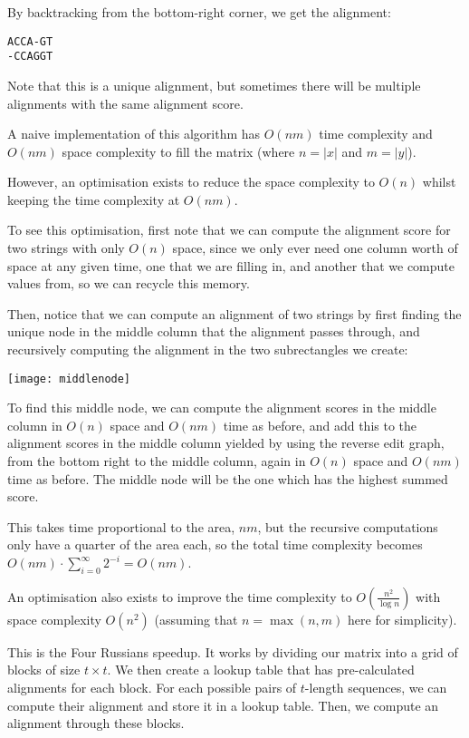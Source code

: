 By backtracking from the bottom-right corner, we get the alignment:

\begin{verbatim}
ACCA-GT
-CCAGGT
\end{verbatim}

Note that this is a unique alignment, but sometimes there will be multiple alignments with the same alignment score.

A naive implementation of this algorithm has $O(nm)$ time complexity and $O(nm)$ space complexity to fill the matrix (where $n = |x|$ and $m = |y|$).

However, an optimisation exists to reduce the space complexity to $O(n)$ whilst keeping the time complexity at $O(nm)$. 

To see this optimisation, first note that we can compute the alignment score for two strings with only $O(n)$ space, since we only ever need one column worth of space at any given time, one that we are filling in, and another that we compute values from, so we can recycle this memory.

Then, notice that we can compute an alignment of two strings by first finding the unique node in the middle column that the alignment passes through, and recursively computing the alignment in the two subrectangles we create:

\texttt{[image: middlenode]}

To find this middle node, we can compute the alignment scores in the middle column in $O(n)$ space and $O(nm)$ time as before, and add this to the alignment scores in the middle column yielded by using the reverse edit graph, from the bottom right to the middle column, again in $O(n)$ space and $O(nm)$ time as before. The middle node will be the one which has the highest summed score.

This takes time proportional to the area, $nm$, but the recursive computations only have a quarter of the area each, so the total time complexity becomes $O(nm) \cdot \sum_{i=0}^\infty 2^{-i} = O(nm)$.

An optimisation also exists to improve the time complexity to $O(\frac{n^2}{\log n})$ with space complexity $O(n^2)$ (assuming that $n = \max(n,m)$ here for simplicity).

This is the Four Russians speedup. It works by dividing our matrix into a grid of blocks of size $t \times t$. We then create a lookup table that has pre-calculated alignments for each block. For each possible pairs of $t$-length sequences, we can compute their alignment and store it in a lookup table. Then, we compute an alignment through these blocks.

